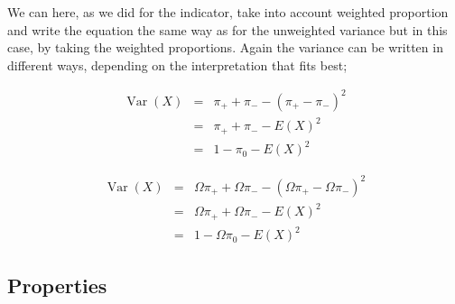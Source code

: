 \documentclass[12pt,a4paper,oneside]{book}
\DeclareMathOperator{\Var}{Var}
\begin{document}
We can here, as we did for the indicator, take into account weighted proportion and write the equation the same way as for the unweighted variance but in this case, by taking the weighted proportions. Again the variance can be written in different ways, depending on the interpretation that fits best;

\begin{eqnarray}
\Var(X) &=& \pi_+ + \pi_- - ( \pi_+ - \pi_- )^2 \\
	&=& \pi_+ + \pi_- - E ( X )^2 \\
	&=& 1 - \pi_0 - E(X)^2
\end{eqnarray}

\begin{eqnarray}
\Var(X) &=& \Omega \pi_+ + \Omega \pi_- - ( \Omega \pi_+ - \Omega \pi_- )^2 \\
	&=& \Omega \pi_+ + \Omega \pi_- - E ( X )^2 \\
	&=& 1 - \Omega \pi_{0} - E(X)^2
\end{eqnarray}


\subsection{Properties}
\end{document}

